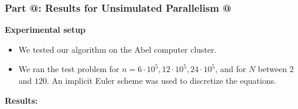 \documentclass[9pt]{beamer}
\makeatletter
\newcommand*{\rom}[1]{\expandafter\@slowromancap\romannumeral #1@}
\makeatother
\begin{document}
\begin{frame}
\frametitle{\textbf{ Part \rom{4}:} Results for Unsimulated Parallelism \rom{1}}
\textbf{Experimental setup}
\begin{itemize}
\item{We tested our algorithm on the Abel computer cluster.}
\item{We ran the test problem for $n=6\cdot 10^5,12\cdot 10^5,24\cdot 10^5$, and for $N$ between $2$ and $120$. An implicit Euler scheme was used to discretize the equations.}
\end{itemize}
\textbf{Results:}
\begin{columns}
\end{columns}
\end{frame}
\end{document}
